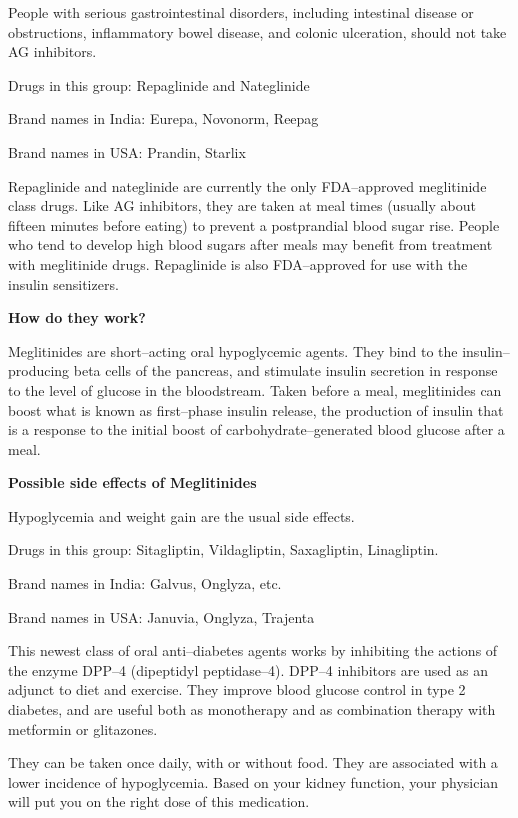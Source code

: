 People with serious gastrointestinal disorders, including intestinal disease or obstructions, inflammatory bowel disease, and colonic ulceration, should not take AG inhibitors.


Drugs in this group: Repaglinide and Nateglinide

Brand names in India: Eurepa, Novonorm, Reepag

Brand names in USA: Prandin, Starlix

Repaglinide and nateglinide are currently the only FDA–approved meglitinide class drugs. Like AG inhibitors, they are taken at meal times (usually about fifteen minutes before eating) to prevent a postprandial blood sugar rise. People who tend to develop high blood sugars after meals may benefit from treatment with meglitinide drugs. Repaglinide is also FDA–approved for use with the insulin sensitizers.

\textbf{How do they work?}

Meglitinides are short–acting oral hypoglycemic agents. They bind to the insulin–producing beta cells of the pancreas, and stimulate insulin secretion in response to the level of glucose in the bloodstream. Taken before a meal, meglitinides can boost what is known as first–phase insulin release, the production of insulin that is a response to the initial boost of carbohydrate–generated blood glucose after a meal.

\textbf{Possible side effects of Meglitinides}

Hypoglycemia and weight gain are the usual side effects.


Drugs in this group: Sitagliptin, Vildagliptin, Saxagliptin, Linagliptin.

Brand names in India: Galvus, Onglyza, etc.

Brand names in USA: Januvia, Onglyza, Trajenta

This newest class of oral anti–diabetes agents works by inhibiting the actions of the enzyme DPP–4 (dipeptidyl peptidase–4). DPP–4 inhibitors are used as an adjunct to diet and exercise. They improve blood glucose control in type 2 diabetes, and are useful both as monotherapy and as combination therapy with metformin or glitazones.

They can be taken once daily, with or without food. They are associated with a lower incidence of hypoglycemia. Based on your kidney function, your physician will put you on the right dose of this medication.

